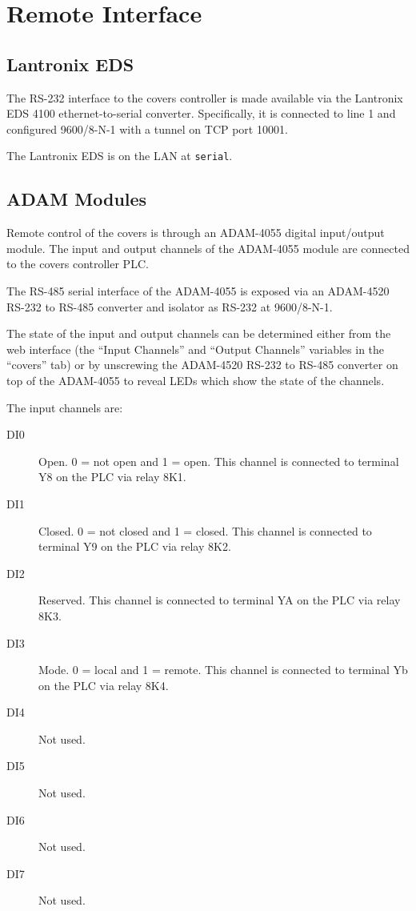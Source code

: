 \section{Remote Interface}
\label{section:covers-remote-interface}

\subsection{Lantronix EDS}
\label{section:covers-lantronix-eds}

The RS-232 interface to the covers controller is made available via the Lantronix EDS 4100 ethernet-to-serial converter. Specifically, it is connected to line 1 and configured 9600/8-N-1 with a tunnel on TCP port 10001.

The Lantronix EDS is on the LAN at \verb|serial|.

\subsection{ADAM Modules}
\label{section:covers-adam-modules}

Remote control of the covers is through an ADAM-4055 digital input/output module. The input and output channels of the ADAM-4055 module are connected to the covers controller PLC.

The RS-485 serial interface of the ADAM-4055 is exposed via an ADAM-4520 RS-232 to RS-485 converter and isolator as RS-232 at 9600/8-N-1.

The state of the input and output channels can be determined either from the web interface (the “Input Channels” and “Output Channels” variables in the “covers” tab) or by unscrewing the ADAM-4520 RS-232 to RS-485 converter on top of the ADAM-4055 to reveal LEDs which show the state of the channels.

The input channels are:
\begin{description}
\item[DI0] Open. 0 = not open and 1 = open. This channel is connected to terminal Y8 on the PLC via relay 8K1.
\item[DI1] Closed. 0 = not closed and 1 = closed. This channel is connected to terminal Y9 on the PLC via relay 8K2.
\item[DI2] Reserved. This channel is connected to terminal YA on the PLC via relay 8K3.
\item[DI3] Mode. 0 = local and 1 = remote. This channel is connected to terminal Yb on the PLC via relay 8K4. 
\item[DI4] Not used.
\item[DI5] Not used.
\item[DI6] Not used.
\item[DI7] Not used.
\end{description}

